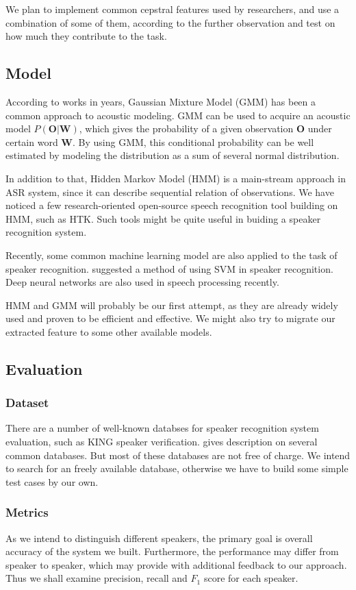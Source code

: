 We plan to implement common cepstral features used by researchers, and use a
combination of some of them, according to the further observation and test on how
much they contribute to the task.

\subsection{Model}
According to works in years, Gaussian Mixture Model (GMM)
has been a common approach to acoustic modeling.\cite{GMM}
GMM can be used to acquire an acoustic model $P(\mathbf{O} | \mathbf{W}) $,
which gives the probability of a given observation
$\mathbf{O}$ under certain word $\mathbf{W}$. By using GMM, this
conditional probability can be well estimated by modeling the distribution as
a sum of several normal distribution.

In addition to that, Hidden Markov Model (HMM) is a main-stream approach in ASR system,
since it can describe sequential relation of observations.\cite{SLP}
We have noticed a few research-oriented open-source speech recognition
tool building on HMM, such as HTK\cite{htk}.
Such tools might be quite useful in buiding a speaker recognition system.

Recently, some common machine learning model are also applied to the task of speaker
recognition. \cite{svm} suggested a method of using SVM in speaker recognition.
Deep neural networks are also used in speech processing recently.\cite{deep}

HMM and GMM will probably be our first attempt, as they are already widely used and proven to be
efficient and effective.  We might also try to migrate our extracted feature to
some other available models.

\subsection{Evaluation}
\subsubsection{Dataset}
There are a number of well-known databses for speaker recognition system evaluation,
such as KING speaker verification\cite{king}. \cite{database} gives description on
several common databases. But most of these databases are not free of charge.
We intend to search for an freely available database,
otherwise we have to build some simple test cases by our own.
\subsubsection{Metrics}
As we intend to distinguish different speakers, the primary goal is overall
accuracy of the system we built. Furthermore, the performance may differ from
speaker to speaker, which may provide with additional feedback to our approach.
Thus we shall examine precision, recall and $F_1$ score for each speaker.

